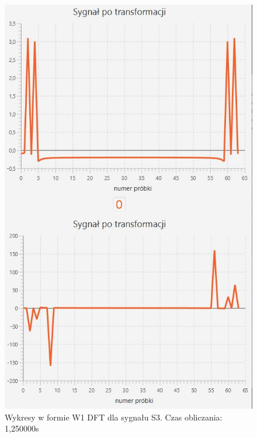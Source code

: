 \documentclass[12pt]{article}
\begin{document}
\begin{figure}[H]
	\centering
	\includegraphics[width=.8\linewidth]{DFT-S3-W1}
	\caption{Wykresy w formie W1 DFT dla sygnału S3. Czas obliczania: 1,250000s}
	\label{S3_sygnal}
\end{figure}
\end{document}
